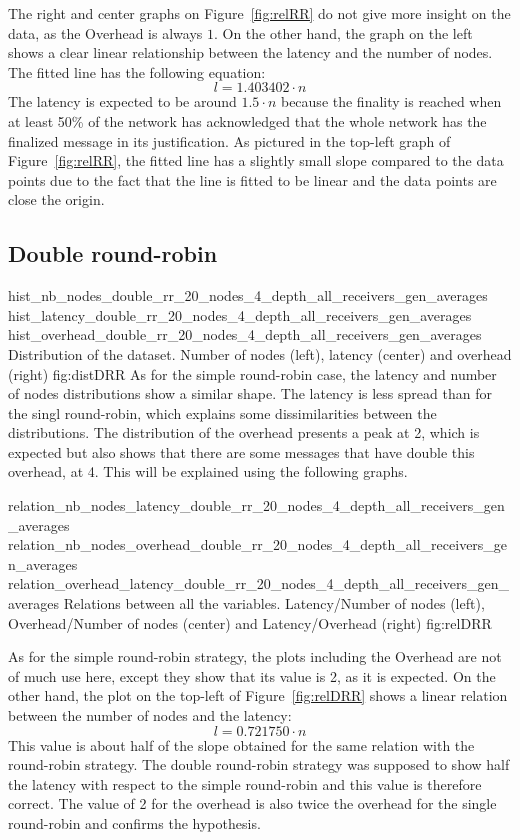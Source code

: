 The right and center graphs on Figure~\ref{fig:relRR} do not give more insight on the
data, as the Overhead is always \(1\). On the other hand, the graph on the left
shows a clear linear relationship between the latency and the number of nodes.
The fitted line has the following equation:
\[l = 1.403402\cdot n\]
The latency is expected to be around \(1.5\cdot n\) because the finality is
reached when at least 50\% of the network has acknowledged that the whole
network has the finalized message in its justification. As pictured in the
top-left graph of Figure~\ref{fig:relRR}, the fitted line has a slightly small
slope compared to the data points due to the fact that the line is fitted to be
linear and the data points are close the origin. 

\subsection{Double round-robin}
\triplefigure
    {hist_nb_nodes_double_rr_20_nodes_4_depth_all_receivers_gen_averages}
    {hist_latency_double_rr_20_nodes_4_depth_all_receivers_gen_averages}
    {hist_overhead_double_rr_20_nodes_4_depth_all_receivers_gen_averages}
    {Distribution of the dataset. Number of nodes (left), latency (center)
    and overhead (right)}
    {fig:distDRR}
As for the simple round-robin case, the latency and number of nodes
distributions show a similar shape. The latency is less spread than for the
singl round-robin, which explains some dissimilarities between the
distributions. The distribution of the overhead presents a peak at 2, which is
expected but also shows that there are some messages that have double this
overhead, at 4. This will be explained using the following graphs. 

\triplefigure
    {relation_nb_nodes_latency_double_rr_20_nodes_4_depth_all_receivers_gen_averages}
    {relation_nb_nodes_overhead_double_rr_20_nodes_4_depth_all_receivers_gen_averages}
    {relation_overhead_latency_double_rr_20_nodes_4_depth_all_receivers_gen_averages}
    {Relations between all the variables. Latency/Number of nodes (left),
    Overhead/Number of nodes (center) and Latency/Overhead (right)}
    {fig:relDRR}

As for the simple round-robin strategy, the plots including the Overhead are not
of much use here, except they show that its value is 2, as it is expected. 
On the other hand, the plot on the top-left of Figure~\ref{fig:relDRR} shows a
linear relation between the number of nodes and the latency: 
\[l = 0.721750 \cdot n\]
This value is about half of the slope obtained for the same relation with the
round-robin strategy. The double round-robin strategy was supposed to show half
the latency with respect to the simple round-robin and this value is therefore
correct. The value of 2 for the overhead is also twice the overhead for the
single round-robin and confirms the hypothesis.
    

